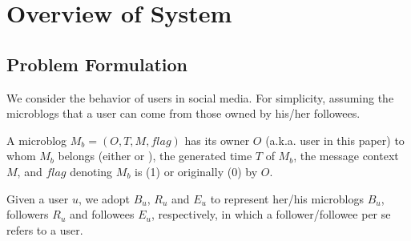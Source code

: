 \section{Overview of System \sys{}}
\label{sec:overv}

\subsection{Problem Formulation}

We consider the \retg{} behavior of users in social media.
For simplicity, assuming the microblogs that a user can \ret{} come from those owned by his/her followees.


\begin{definition}
\label{def:blog}
A microblog $M_b = (O, T, M, flag)$ has its owner $O$ (a.k.a. user in this paper) to whom $M_b$ belongs (either \twd{} or \retd{}), the generated time $T$ of $M_b$, the message context $M$, and $flag$ denoting $M_b$ is \retd{} (1) or originally \tw{} (0) by $O$.
\end{definition}

\begin{definition}
\label{def:user}
Given a user $u$, we adopt $B_u$, $R_u$ and $E_u$ to represent her/his microblogs $B_u$, followers $R_u$ and followees $E_u$,  respectively, in which a follower/followee per se refers to a user.
\end{definition}


